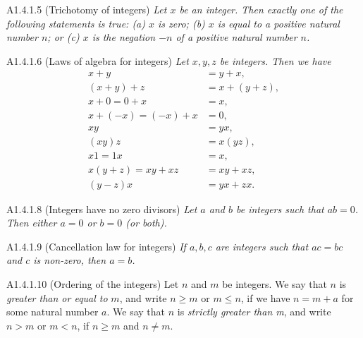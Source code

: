 \begin{lemma}{A1.4.1.5}
    (Trichotomy of integers) \emph{Let $x$ be an integer. Then exactly one of the following statements is true: (a)
    $x$ is zero; (b) $x$ is equal to a positive natural number $n$; or (c) $x$ is the negation $-n$ of a positive
    natural number $n$.}
\end{lemma}

\begin{lemma}{A1.4.1.6}
    (Laws of algebra for integers) \emph{Let $x, y, z$ be integers. Then we have
    \begin{align*}
        x + y &= y + x,\\
        (x + y) + z &= x + (y + z),\\
        x + 0 = 0 + x &= x,\\
        x + (-x) = (-x) + x &= 0,\\
        xy &= yx,\\
        (xy)z &= x(yz),\\
        x1=1x &= x,\\
        x(y + z) = xy + xz &= xy + xz,\\
        (y - z)x &= yx + zx.
    \end{align*}
    }
\end{lemma}

\begin{proposition}{A1.4.1.8}
    (Integers have no zero divisors) \emph{Let $a$ and $b$ be integers such that $ab = 0$. Then either $a = 0$ or
    $b = 0$ (or both).}
\end{proposition}

\begin{corollary}{A1.4.1.9}
    (Cancellation law for integers) \emph{If $a, b, c$ are integers such that $ac = bc$ and $c$ is non-zero, then
    $a = b$.}
\end{corollary}

\begin{definition}{A1.4.1.10}
    (Ordering of the integers) Let $n$ and $m$ be integers. We say that $n$ is \emph{greater than or equal to} $m$,
    and write $n \geq m$ or $m \leq n$, if we have $n = m + a$ for some natural number $a$. We say that $n$ is
    \emph{strictly greater than m}, and write $n > m$ or $m < n$, if $n \geq m$ and $n \neq m$.
\end{definition}

